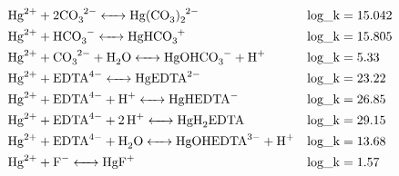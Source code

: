\documentclass[12pt, a4paper]{article}
\begin{document}
\begin{align}
& \ce{Hg^2+ + 2 CO3^2- <-> Hg(CO3)_2^2-} && \mathrm{log\_k} = 15.042 \\
& \ce{Hg^2+ + HCO3^- <-> HgHCO3^+} && \mathrm{log\_k} = 15.805 \\
& \ce{Hg^2+ + CO_3^2- + H2O <-> HgOHCO3^- + H+} && \mathrm{log\_k} = 5.33 \\
& \ce{Hg^2+ + EDTA^4- <-> HgEDTA^2-} && \mathrm{log\_k} = 23.22 \\
& \ce{Hg^2+ + EDTA^4- + H+ <-> HgHEDTA^-} && \mathrm{log\_k} = 26.85 \\
& \ce{Hg^2+ + EDTA^4- + 2H+ <-> HgH2EDTA} && \mathrm{log\_k} = 29.15 \\
& \ce{Hg^2+ + EDTA^4- + H2O <-> HgOHEDTA^3- + H+} && \mathrm{log\_k} = 13.68 \\
& \ce{Hg^2+ + F^- <-> HgF^+} && \mathrm{log\_k} = 1.57
\end{align}
\end{document}
